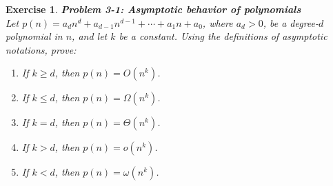 \documentclass[12pt]{article}
\newtheorem{exercise}[theorem]{Exercise}
\theoremstyle{definition}
\begin{document}
\begin{exercise}
\noindent
\textbf{Problem 3-1: Asymptotic behavior of polynomials} \\
Let $p(n)=a_d n^d + a_{d-1}n^{d-1}+\cdots + a_1 n + a_0$, where $a_d>0$, be a degree-$d$ polynomial in $n$, and let $k$ be a constant. Using the \emph{definitions} of asymptotic notations, prove:
\begin{enumerate}
\item[(a)] If $k \ge d$, then $p(n)=O(n^k)$.
\item[(b)] If $k \le d$, then $p(n)=\Omega(n^k)$.
\item[(c)] If $k=d$, then $p(n)=\Theta(n^k)$.
\item[(d)] If $k>d$, then $p(n)=o(n^k)$.
\item[(e)] If $k<d$, then $p(n)=\omega(n^k)$.
\end{enumerate}
\end{exercise}
\end{document}
